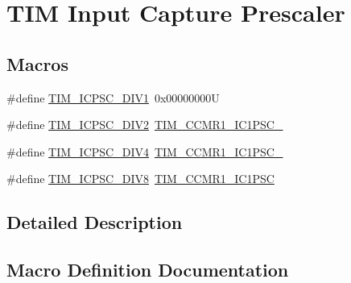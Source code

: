 \hypertarget{group___t_i_m___input___capture___prescaler}{}\section{T\+IM Input Capture Prescaler}
\label{group___t_i_m___input___capture___prescaler}
\subsection*{Macros}
\begin{DoxyCompactItemize}
\item 
\#define \hyperlink{group___t_i_m___input___capture___prescaler_ga8acb44abe3147d883685c1f9f1ce410e}{T\+I\+M\+\_\+\+I\+C\+P\+S\+C\+\_\+\+D\+I\+V1}~0x00000000U
\item 
\#define \hyperlink{group___t_i_m___input___capture___prescaler_ga1d8a7b66add914e2ddd910d2d700978f}{T\+I\+M\+\_\+\+I\+C\+P\+S\+C\+\_\+\+D\+I\+V2}~\hyperlink{group___peripheral___registers___bits___definition_ga05673358a44aeaa56daefca67341b29d}{T\+I\+M\+\_\+\+C\+C\+M\+R1\+\_\+\+I\+C1\+P\+S\+C\+\_}
\item 
\#define \hyperlink{group___t_i_m___input___capture___prescaler_gaf5a675046430fa0f0c95b0dac612828f}{T\+I\+M\+\_\+\+I\+C\+P\+S\+C\+\_\+\+D\+I\+V4}~\hyperlink{group___peripheral___registers___bits___definition_gaf42b75da9b2f127dca98b6ca616f7add}{T\+I\+M\+\_\+\+C\+C\+M\+R1\+\_\+\+I\+C1\+P\+S\+C\+\_}
\item 
\#define \hyperlink{group___t_i_m___input___capture___prescaler_ga5086cb03c89a5c67b199d20b605f00cb}{T\+I\+M\+\_\+\+I\+C\+P\+S\+C\+\_\+\+D\+I\+V8}~\hyperlink{group___peripheral___registers___bits___definition_gab46b7186665f5308cd2ca52acfb63e72}{T\+I\+M\+\_\+\+C\+C\+M\+R1\+\_\+\+I\+C1\+P\+SC}
\end{DoxyCompactItemize}


\subsection{Detailed Description}


\subsection{Macro Definition Documentation}
\mbox{\label{group___t_i_m___input___capture___prescaler_ga8acb44abe3147d883685c1f9f1ce410e}} 
